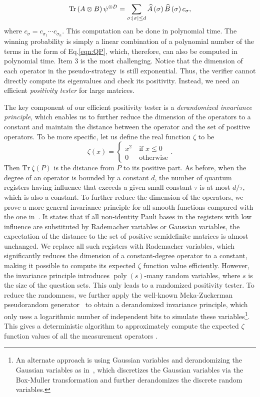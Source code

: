 \documentclass[10pt,a4paper]{article}
\theoremstyle{plain}
\theoremstyle{definition}
\newcommand {\br} [1] {\ensuremath{ \left( #1 \right) }}
\DeclarePairedDelimiter{\abs}{\lvert}{\rvert}
\newcommand {\Tr} {\ensuremath{ \mathrm{Tr} }}
\newcommand{\poly} {\ensuremath{\operatorname{poly}}}
\newcommand{\pseudostrategy} {pseudo-strategy}
\newcommand{\1}{\mathbb{1}} %
\begin{document}
\begin{equation}\label{eqn:QP}
\Tr\br{A\otimes B}\psi^{\otimes D}=\sum_{\sigma:\abs{\sigma}\leq d}\widehat{A}\br{\sigma}\widehat{B}\br{\sigma}c_{\sigma},
\end{equation}
where $c_{\sigma}=c_{\sigma_1}\cdots c_{\sigma_n}$. This computation can be done in polynomial time. The winning probability is simply a linear combination of a polynomial number of the terms in the form of Eq.\eqref{eqn:QP}, which, therefore, can also be computed in polynomial time. Item 3 is the most challenging. Notice that the dimension of each operator in the \pseudostrategy~is still exponential. Thus, the verifier cannot directly compute its eigenvalues and check its positivity. 
Instead, we need an efficient {\em positivity tester} for large matrices.

The key component of our efficient positivity tester is a {\em derandomized invariance principle}, which enables us to further reduce the dimension of the operators to a constant and maintain the distance between the operator and the set of positive operators.
To be more specific, let us define the real function $\zeta$ to be 
\begin{equation}\label{eqn:introzeta}
	\zeta\br{x}=\begin{cases}x^2~&\mbox{if $x\leq 0$}\\ 0~&\mbox{otherwise}\end{cases}.
\end{equation}
Then $\Tr~\zeta(P)$ is the distance from $P$ to its positive part.
As before, when the degree of an operator is bounded by a constant $d$, the number of quantum registers having influence that exceeds a given small constant $\tau$ is at most $d/\tau$, which is also a constant.
To further reduce the dimension of the operators,
we prove a more general invariance principle for all smooth functions compared with the one in~\cite{qin2021nonlocal}. 
It states that if all non-identity Pauli bases in the registers with low influence are substituted by Rademacher variables or Gaussian variables, the expectation of the distance to the set of positive semidefinite matrices is almost unchanged. 
We replace all such registers with Rademacher variables, which significantly reduces the dimension of a constant-degree operator to a constant, making it possible to compute its expected $\zeta$ function value efficiently. 
However, the invariance principle introduces $\poly\br{s}$-many random variables, where $s$ is the size of the question sets. 
This only leads to a randomized positivity tester. 
To reduce the randomness, we further apply the well-known Meka-Zuckerman pseudorandom generator~\cite{10.1145/1806689.1806749} to obtain a derandomized invariance principle, which only uses a logarithmic number of independent bits to simulate these variables\footnote{An alternate approach is using Gaussian variables and derandomizing the Gaussian variables as in~\cite{kane:LIPIcs.CCC.2015.567}, which discretizes the Gaussian variables via the Box-Muller transformation and further derandomizes the discrete random variables.}. This gives a deterministic algorithm to approximately compute the expected $\zeta$ function values of all the measurement operators .
\end{document}
